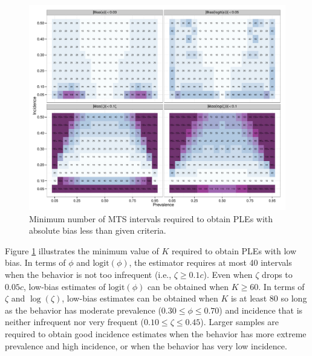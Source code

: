 \documentclass[man, noextraspace, floatsintext]{apa6}\usepackage[]{graphicx}\usepackage[]{color}
\makeatletter
\def\maxwidth{ %
  \ifdim\Gin@nat@width>\linewidth
    \linewidth
  \else
    \Gin@nat@width
  \fi
}
\newenvironment{knitrout}{}{} %
\newcommand{\logit}{\text{logit}}
\makeatother
\begin{document}
\begin{knitrout}
\color{fgcolor}\begin{figure}[tb]


{\centering \includegraphics[width=\maxwidth]{fig/MTS_sample_size} 

}

\caption[Minimum number of MTS intervals required to obtain PLEs with absolute bias less than given criteria]{Minimum number of MTS intervals required to obtain PLEs with absolute bias less than given criteria.\label{fig:MTS_sample_size}}
\end{figure}


\end{knitrout}

Figure \ref{fig:MTS_sample_size} illustrates the minimum value of $K$ required to obtain PLEs with low bias. 
In terms of $\phi$ and $\logit(\phi)$, the estimator requires at most 40 intervals when the behavior is not too infrequent (i.e., $\zeta \geq 0.1 c$).
Even when $\zeta$ drops to $0.05 c$, low-bias estimates of $\logit(\phi)$ can be obtained when $K \geq 60$. 
In terms of $\zeta$ and $\log(\zeta)$, low-bias estimates can be obtained when $K$ is at least 80 so long as the behavior has moderate prevalence ($0.30 \leq \phi \leq 0.70$) and incidence that is neither infrequent nor very frequent ($0.10 \leq \zeta \leq 0.45$). 
Larger samples are required to obtain good incidence estimates when the behavior has more extreme prevalence and high incidence, or when the behavior has very low incidence. 
\end{document}
